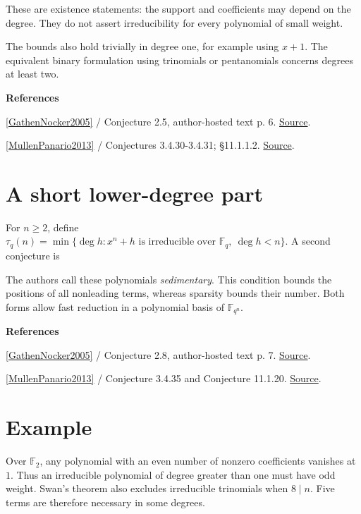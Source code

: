 \documentclass[11pt,a4paper,oneside,openany]{book}
\newcommand{\atlasdisplay}[1]{\par\begingroup\centering\vspace{3pt}\noindent\adjustbox{max width=\linewidth}{\(\displaystyle #1\)}\par\vspace{5pt}\endgroup}
\newenvironment{sources}{\par\smallskip\begingroup\footnotesize\color{atlasgray}\leftskip=10pt\setlength{\parskip}{2pt}}{\par\endgroup\smallskip}
\begin{document}
\atlasdisplay{\sigma_2(n)\le5,\qquad \sigma_q(n)\le4\quad(q\ge3).}
\color{black} These are existence statements: the support and coefficients may depend on the degree. They do not assert irreducibility for every polynomial of small weight.\par
\color{black} The bounds also hold trivially in degree one, for example using \(x+1\). The equivalent binary formulation using trinomials or pentanomials concerns degrees at least two.\par
\begin{sources}
\textbf{References}\par\smallskip
\noindent\hyperlink{ref:GathenNocker2005}{[GathenNocker2005]} / Conjecture 2.5, author-hosted text p. 6.  \href{https://vonzurgathen.online/old/files/gatnoc05.pdf}{Source}.\par
\noindent\hyperlink{ref:MullenPanario2013}{[MullenPanario2013]} / Conjectures 3.4.30-3.4.31; §11.1.1.2.  \href{https://doi.org/10.1201/b15006}{Source}.\par
\end{sources}\color{black}
\section{A short lower-degree part}
\color{black} For \(n\ge2\), define \(\tau_q(n)=\min\{\deg h:x^n+h\text{ is irreducible over }\mathbb F_q,\ \deg h<n\}\). A second conjecture is\par

\atlasdisplay{\tau_q(n)\le3+\log_q n.}
\color{black} The authors call these polynomials \emph{sedimentary}. This condition bounds the positions of all nonleading terms, whereas sparsity bounds their number. Both forms allow fast reduction in a polynomial basis of \(\mathbb F_{q^n}\).\par
\begin{sources}
\textbf{References}\par\smallskip
\noindent\hyperlink{ref:GathenNocker2005}{[GathenNocker2005]} / Conjecture 2.8, author-hosted text p. 7.  \href{https://vonzurgathen.online/old/files/gatnoc05.pdf}{Source}.\par
\noindent\hyperlink{ref:MullenPanario2013}{[MullenPanario2013]} / Conjecture 3.4.35 and Conjecture 11.1.20.  \href{https://doi.org/10.1201/b15006}{Source}.\par
\end{sources}\color{black}
\section{Example}
\color{black} Over \(\mathbb F_2\), any polynomial with an even number of nonzero coefficients vanishes at \(1\). Thus an irreducible polynomial of degree greater than one must have odd weight. Swan's theorem also excludes irreducible trinomials when \(8\mid n\). Five terms are therefore necessary in some degrees.\par
\end{document}
